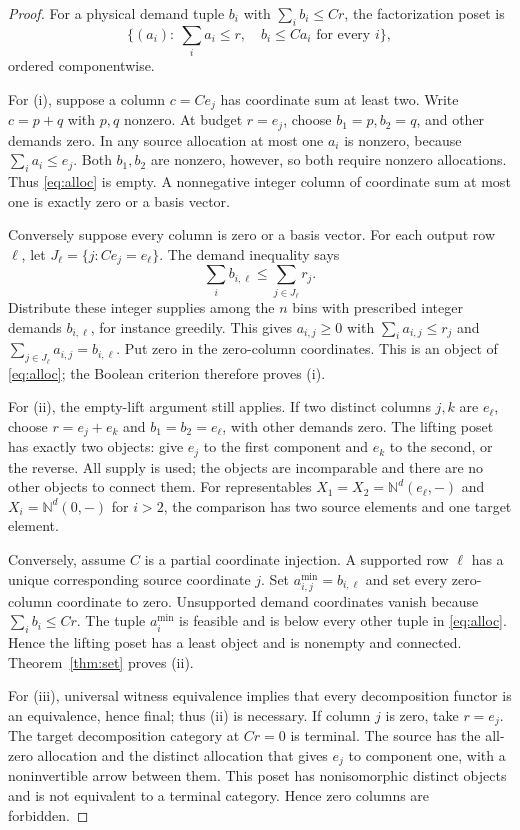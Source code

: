 \documentclass[11pt]{article}
\theoremstyle{definition}\newtheorem{definition}[theorem]{Definition}
\theoremstyle{remark}\newtheorem{remark}[theorem]{Remark}
\newcommand{\N}{\mathbb N}
\begin{document}
\begin{proof}
For a physical demand tuple $b_i$ with $\sum_i b_i\leq Cr$, the
factorization poset is
\begin{equation}\label{eq:alloc}
 \{(a_i):\ \sum_i a_i\leq r,\quad b_i\leq Ca_i\text{ for every }i\},
\end{equation}
ordered componentwise.

For (i), suppose a column $c=Ce_j$ has coordinate sum at least two.
Write $c=p+q$ with $p,q$ nonzero. At budget $r=e_j$, choose
$b_1=p,b_2=q$, and other demands zero. In any source allocation at most
one $a_i$ is nonzero, because $\sum_i a_i\leq e_j$. Both $b_1,b_2$
are nonzero, however, so both require nonzero allocations. Thus
\eqref{eq:alloc} is empty. A nonnegative integer column of coordinate
sum at most one is exactly zero or a basis vector.

Conversely suppose every column is zero or a basis vector. For each
output row $\ell$, let $J_\ell=\{j:Ce_j=e_\ell\}$. The demand
inequality says
\[
 \sum_i b_{i,\ell}\leq\sum_{j\in J_\ell}r_j.
\]
Distribute these integer supplies among the $n$ bins with prescribed
integer demands $b_{i,\ell}$, for instance greedily. This gives
$a_{i,j}\geq0$ with $\sum_i a_{i,j}\leq r_j$ and
$\sum_{j\in J_\ell}a_{i,j}=b_{i,\ell}$. Put zero in the zero-column
coordinates. This is an object of \eqref{eq:alloc}; the Boolean criterion
therefore proves (i).

For (ii), the empty-lift argument still applies. If two distinct columns
$j,k$ are $e_\ell$, choose $r=e_j+e_k$ and
$b_1=b_2=e_\ell$, with other demands zero. The lifting poset has exactly
two objects: give $e_j$ to the first component and $e_k$ to the second,
or the reverse. All supply is used; the objects are incomparable and
there are no other objects to connect them. For representables
$X_1=X_2=\N^d(e_\ell,-)$ and $X_i=\N^d(0,-)$ for $i>2$, the
comparison has two source elements and one target element.

Conversely, assume $C$ is a partial coordinate injection. A supported
row $\ell$ has a unique corresponding source coordinate $j$. Set
$a^{\min}_{i,j}=b_{i,\ell}$ and set every zero-column coordinate to zero.
Unsupported demand coordinates vanish because $\sum_i b_i\leq Cr$.
The tuple $a_i^{\min}$ is feasible and is below every other tuple in
\eqref{eq:alloc}. Hence the lifting poset has a least object and is
nonempty and connected. Theorem~\ref{thm:set} proves (ii).

For (iii), universal witness equivalence implies that every decomposition
functor is an equivalence, hence final; thus (ii) is necessary. If column
$j$ is zero, take $r=e_j$. The target decomposition category at $Cr=0$
is terminal. The source has the all-zero allocation and the distinct
allocation that gives $e_j$ to component one, with a noninvertible arrow
between them. This poset has nonisomorphic distinct objects and is not
equivalent to a terminal category. Hence zero columns are forbidden.


\end{proof}
\end{document}
